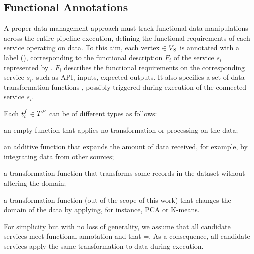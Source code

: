     \subsection{Functional Annotations}\label{sec:funcannotation}
    A proper data management approach must track functional data manipulations across the entire pipeline execution, defining the functional requirements of each service operating on data.
    To this aim, each vertex $\in V_S$ is annotated with a label \myGamma(), corresponding to the functional description $F_i$ of the service $s_i$ represented by .
  $F_i$ describes the functional requirements on the corresponding service $s_i$, such as API, inputs, expected outputs.
    It also specifies a set \TF{} of data transformation functions , possibly triggered during execution of the connected service $s_i$.

    Each $t^f_{i}$$\in$$T^F_{}$ can be of different types as follows:
\begin{enumerate*}[label=\roman*)]
  \item an empty function \tf{\epsilon} that applies no transformation or processing on the data;
  \item an additive function  that expands the amount of data received, for example, by integrating data from other sources;
  \item a transformation function  that transforms some records in the dataset without altering the domain;
  \item a transformation function  (out of the scope of this work) that changes the domain of the data by applying, for instance, PCA or K-means.
\end{enumerate*}

For simplicity but with no loss of generality, we assume that all candidate services meet functional annotation \F{} and that \TF{}=\tf{}. As a consequence, all candidate services apply the same transformation to data during execution.

